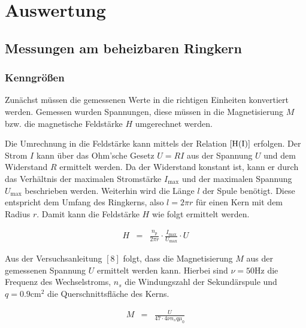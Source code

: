 \documentclass[12pt,a4paper]{scrartcl}
\numberwithin{equation}{section} %
\newcommand{\pu}[1]{\ensuremath{\mathrm{#1}}}
\renewcommand{\[}{} %
\renewcommand{\]}{\noindent} %
\begin{document}
\hypertarget{auswertung}{%
\section{Auswertung}\label{auswertung}}

\hypertarget{messungen-am-beheizbaren-ringkern}{%
\subsection{Messungen am beheizbaren
Ringkern}\label{messungen-am-beheizbaren-ringkern}}

\hypertarget{kenngruxf6uxdfen}{%
\subsubsection{Kenngrößen}\label{kenngruxf6uxdfen}}

Zunächst müssen die gemessenen Werte in die richtigen Einheiten
konvertiert werden. Gemessen wurden Spannungen, diese müssen in die
Magnetisierung \(M\) bzw. die magnetische Feldstärke \(H\) umgerechnet
werden.

Die Umrechnung in die Feldstärke kann mittels der Relation
\(\eqref{H(I)}\) erfolgen. Der Strom \(I\) kann über das Ohm'sche Gesetz
\(U=RI\) aus der Spannung \(U\) und dem Widerstand \(R\) ermittelt
werden. Da der Widerstand konstant ist, kann er durch das Verhältnis der
maximalen Stromstärke \(I_\mathrm{max}\) und der maximalen Spannung
\(U_\mathrm{max}\) beschrieben werden. Weiterhin wird die Länge \(l\)
der Spule benötigt. Diese entspricht dem Umfang des Ringkerns, also
\(l=2\pi r\) für einen Kern mit dem Radius \(r\). Damit kann die
Feldstärke \(H\) wie folgt ermittelt werden.

\[
\begin{eqnarray}
    H &=&
        \frac{n_p}{2\pi r} \cdot \frac{I_\mathrm{max}}{U_\mathrm{max}} \cdot U
        \label{H}
\end{eqnarray}
\]

Aus der Versuchsanleitung \([8]\) folgt, dass die Magnetisierung \(M\)
aus der gemessenen Spannung \(U\) ermittelt werden kann. Hierbei sind
\(\nu=\pu{50 Hz}\) die Frequenz des Wechselstroms, \(n_s\) die
Windungszahl der Sekundärspule und \(q = \pu{0.9 cm^2}\) die
Querschnittsfläche des Kerns.

\[
\begin{eqnarray}
    M &=&
        \frac{U}{47\cdot 4\nu n_s q \mu_0}
        \label{M}
\end{eqnarray}
\]
\end{document}
